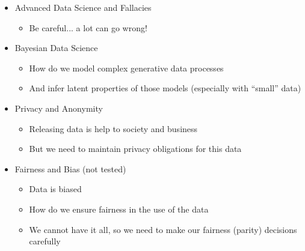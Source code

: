 \documentclass[11pt]{article}
\theoremstyle{definition}
\begin{document}
\begin{itemize}
  \item Advanced Data Science and Fallacies
  \begin{itemize}
    \item Be careful... a lot can go wrong!
  \end{itemize}
  \item Bayesian Data Science
  \begin{itemize}
    \item How do we model complex generative data processes
    \item And infer latent properties of those models (especially with “small” data)
  \end{itemize}
  \item Privacy and Anonymity
  \begin{itemize}
    \item Releasing data is help to society and business
    \item But we need to maintain privacy obligations for this data
  \end{itemize}
  \item Fairness and Bias (not tested)
  \begin{itemize}
    \item Data is biased
    \item How do we ensure fairness in the use of the data
    \item We cannot have it all, so we need to make our fairness (parity) decisions carefully
  \end{itemize}
\end{itemize}
\end{document}
